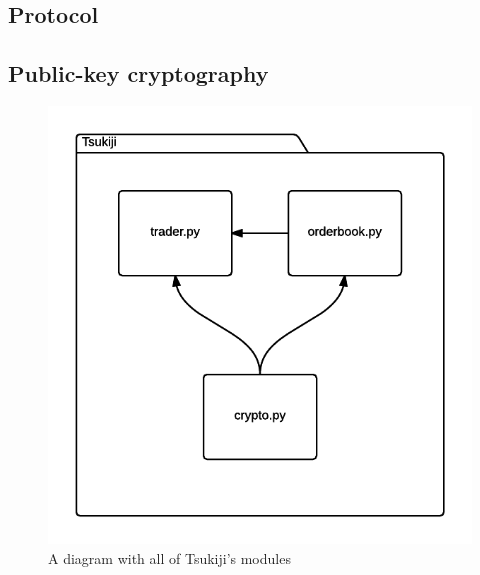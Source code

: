 
\subsection{Protocol}
\label{protocol}

\subsection{Public-key cryptography}
\label{publickeycryptography}

\begin{figure}
  \centering
  \includegraphics[width=\textwidth]{modules}
  \caption{A diagram with all of Tsukiji's modules}
  \label{modulesfig}
\end{figure}
